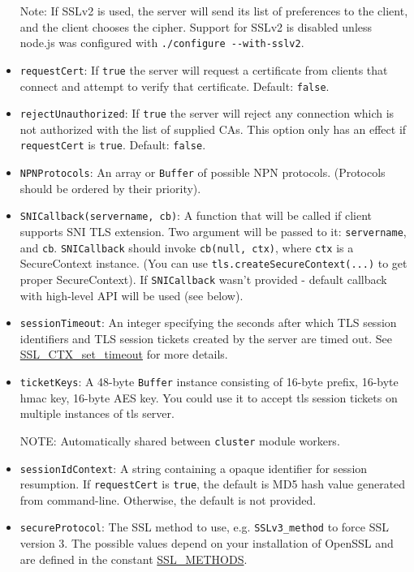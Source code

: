 \begin{itemize}
  Note: If SSLv2 is used, the server will send its list of preferences
  to the client, and the client chooses the cipher. Support for SSLv2 is
  disabled unless node.js was configured with
  \texttt{./configure -{}-with-sslv2}.
\item
  \texttt{requestCert}: If \texttt{true} the server will request a
  certificate from clients that connect and attempt to verify that
  certificate. Default: \texttt{false}.
\item
  \texttt{rejectUnauthorized}: If \texttt{true} the server will reject
  any connection which is not authorized with the list of supplied CAs.
  This option only has an effect if \texttt{requestCert} is
  \texttt{true}. Default: \texttt{false}.
\item
  \texttt{NPNProtocols}: An array or \texttt{Buffer} of possible NPN
  protocols. (Protocols should be ordered by their priority).
\item
  \texttt{SNICallback(servername, cb)}: A function that will be called
  if client supports SNI TLS extension. Two argument will be passed to
  it: \texttt{servername}, and \texttt{cb}. \texttt{SNICallback} should
  invoke \texttt{cb(null, ctx)}, where \texttt{ctx} is a SecureContext
  instance. (You can use \texttt{tls.createSecureContext(...)} to get
  proper SecureContext). If \texttt{SNICallback} wasn't provided -
  default callback with high-level API will be used (see below).
\item
  \texttt{sessionTimeout}: An integer specifying the seconds after which
  TLS session identifiers and TLS session tickets created by the server
  are timed out. See
  \href{http://www.openssl.org/docs/ssl/SSL_CTX_set_timeout.html}{SSL\_CTX\_set\_timeout}
  for more details.
\item
  \texttt{ticketKeys}: A 48-byte \texttt{Buffer} instance consisting of
  16-byte prefix, 16-byte hmac key, 16-byte AES key. You could use it to
  accept tls session tickets on multiple instances of tls server.

  NOTE: Automatically shared between \texttt{cluster} module workers.
\item
  \texttt{sessionIdContext}: A string containing a opaque identifier for
  session resumption. If \texttt{requestCert} is \texttt{true}, the
  default is MD5 hash value generated from command-line. Otherwise, the
  default is not provided.
\item
  \texttt{secureProtocol}: The SSL method to use, e.g.
  \texttt{SSLv3\_method} to force SSL version 3. The possible values
  depend on your installation of OpenSSL and are defined in the constant
  \href{http://www.openssl.org/docs/ssl/ssl.html\#DEALING_WITH_PROTOCOL_METHODS}{SSL\_METHODS}.
\end{itemize}

